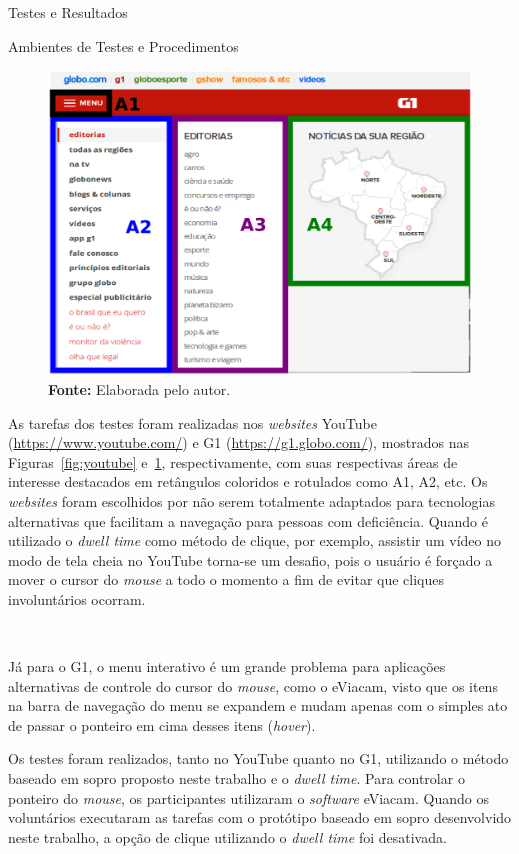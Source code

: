 \begin{chapter}{Testes e Resultados}
\begin{section}{Ambientes de Testes e Procedimentos}
\begin{figure}[!b]
	\centering
	\includegraphics[width=.9\linewidth]{fig/g1}
	\caption{Áreas de interesse do \textit{website} G1.}
	\vspace{-1cm}
	\caption*{\textbf{Fonte: }Elaborada pelo autor.}
	\label{fig:g1}
\end{figure}

As tarefas dos testes foram realizadas nos \textit{websites}
YouTube (\url{https://www.youtube.com/}) e
G1 (\url{https://g1.globo.com/}), mostrados nas
Figuras~\ref{fig:youtube} e~\ref{fig:g1}, respectivamente, com suas respectivas
áreas de interesse destacados em retângulos coloridos e rotulados como A1, A2,
etc. Os \textit{websites} foram escolhidos por não serem totalmente adaptados
para tecnologias alternativas que facilitam a navegação para pessoas com
deficiência. Quando é utilizado o \textit{dwell time} como método de clique, por
exemplo, assistir um vídeo no modo de tela cheia no YouTube torna-se um desafio,
pois o usuário é forçado a mover o cursor do \textit{mouse} a todo o momento
a fim de evitar que cliques involuntários ocorram. 

~

Já para o G1, o menu
interativo é um grande problema para aplicações alternativas de controle
do cursor do \textit{mouse}, como o eViacam, visto que os itens na barra de
navegação do menu se expandem e mudam apenas com o simples ato de passar o
ponteiro em cima desses itens (\textit{hover}).

Os testes foram realizados, tanto no YouTube quanto no G1, utilizando o método
baseado em sopro proposto neste trabalho e o \textit{dwell time}. Para controlar
o ponteiro do \textit{mouse}, os participantes utilizaram o \textit{software}
eViacam. Quando os voluntários executaram as tarefas com o protótipo baseado em
sopro desenvolvido neste trabalho, a opção de clique utilizando o 
\textit{dwell time} foi desativada. 


\end{section}
\end{chapter}
